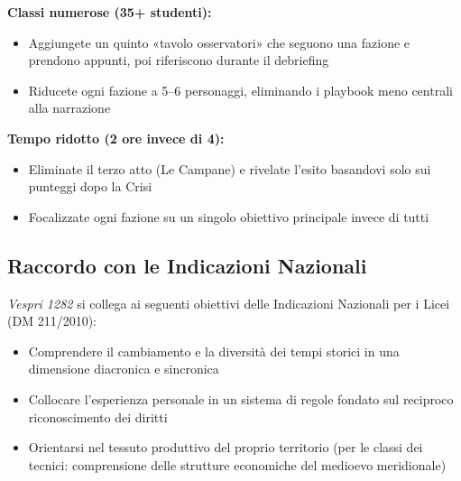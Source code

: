 \textbf{Classi numerose (35+ studenti):}
\begin{itemize}[nosep]
  \item Aggiungete un quinto «tavolo osservatori» che seguono
    una fazione e prendono appunti, poi riferiscono durante
    il debriefing
  \item Riducete ogni fazione a 5--6 personaggi, eliminando
    i playbook meno centrali alla narrazione
\end{itemize}

\textbf{Tempo ridotto (2 ore invece di 4):}
\begin{itemize}[nosep]
  \item Eliminate il terzo atto (Le Campane) e rivelate
    l'esito basandovi solo sui punteggi dopo la Crisi
  \item Focalizzate ogni fazione su un singolo obiettivo
    principale invece di tutti
\end{itemize}

\subsection{Raccordo con le Indicazioni Nazionali}

\textit{Vespri 1282} si collega ai seguenti obiettivi delle
Indicazioni Nazionali per i Licei (DM 211/2010):

\begin{itemize}[nosep]
  \item Comprendere il cambiamento e la diversità dei tempi
    storici in una dimensione diacronica e sincronica
  \item Collocare l'esperienza personale in un sistema di
    regole fondato sul reciproco riconoscimento dei diritti
  \item Orientarsi nel tessuto produttivo del proprio territorio
    (per le classi dei tecnici: comprensione delle strutture
    economiche del medioevo meridionale)
\end{itemize}

\filettodoppio